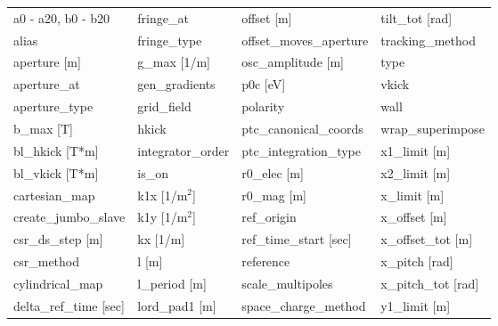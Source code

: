  \begin{tabular}{llll} \toprule
a0 - a20, b0 - b20               & fringe_at                        & offset [m]                       & tilt_tot [rad]                   \\
alias                            & fringe_type                      & offset_moves_aperture            & tracking_method                  \\
aperture [m]                     & g_max [1/m]                      & osc_amplitude [m]                & type                             \\
aperture_at                      & gen_gradients                    & p0c [eV]                         & vkick                            \\
aperture_type                    & grid_field                       & polarity                         & wall                             \\
b_max [T]                        & hkick                            & ptc_canonical_coords             & wrap_superimpose                 \\
bl_hkick [T*m]                   & integrator_order                 & ptc_integration_type             & x1_limit [m]                     \\
bl_vkick [T*m]                   & is_on                            & r0_elec [m]                      & x2_limit [m]                     \\
cartesian_map                    & k1x [1/m$^2$]                    & r0_mag [m]                       & x_limit [m]                      \\
create_jumbo_slave               & k1y [1/m$^2$]                    & ref_origin                       & x_offset [m]                     \\
csr_ds_step [m]                  & kx [1/m]                         & ref_time_start [sec]             & x_offset_tot [m]                 \\
csr_method                       & l [m]                            & reference                        & x_pitch [rad]                    \\
cylindrical_map                  & l_period [m]                     & scale_multipoles                 & x_pitch_tot [rad]                \\
delta_ref_time [sec]             & lord_pad1 [m]                    & space_charge_method              & y1_limit [m]                     \\

\end{tabular}
